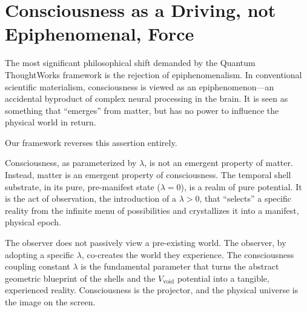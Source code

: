 \documentclass[12pt]{report}
\begin{document}
\section{Consciousness as a Driving, not Epiphenomenal, Force}
The most significant philosophical shift demanded by the Quantum ThoughtWorks framework is the rejection of epiphenomenalism. In conventional scientific materialism, consciousness is viewed as an epiphenomenon---an accidental byproduct of complex neural processing in the brain. It is seen as something that ``emerges'' from matter, but has no power to influence the physical world in return.

Our framework reverses this assertion entirely.

Consciousness, as parameterized by $\lambda$, is not an emergent property of matter. Instead, matter is an emergent property of consciousness. The temporal shell substrate, in its pure, pre-manifest state ($\lambda=0$), is a realm of pure potential. It is the act of observation, the introduction of a $\lambda > 0$, that ``selects'' a specific reality from the infinite menu of possibilities and crystallizes it into a manifest, physical epoch.

The observer does not passively view a pre-existing world. The observer, by adopting a specific $\lambda$, co-creates the world they experience. The consciousness coupling constant $\lambda$ is the fundamental parameter that turns the abstract geometric blueprint of the shells and the $V_{\text{void}}$ potential into a tangible, experienced reality. Consciousness is the projector, and the physical universe is the image on the screen.
\end{document}
